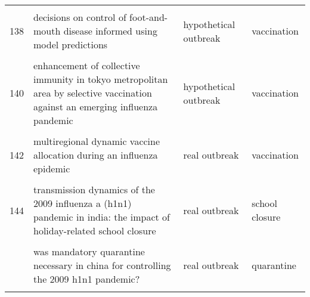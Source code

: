 \documentclass[
]{article}
\begin{document}
\begin{landscape}
\begin{longtable}{l>{\raggedright\arraybackslash}p{3cm}l>{\raggedright\arraybackslash}p{8cm}}
\cellcolor{gray!6}{137} & \cellcolor{gray!6}{cost-effectiveness of workplace closure and travel restriction for mitigating influenza outbreaks: a network-based simulation} & \cellcolor{gray!6}{hypothetical outbreak} & \cellcolor{gray!6}{antiviral prophylaxis,distancing,school closure,travel restriction}\\
138 & decisions on control of foot-and-mouth disease informed using model predictions & hypothetical outbreak & vaccination\\
\cellcolor{gray!6}{139} & \cellcolor{gray!6}{dengue in cape verde: vector control and vaccination} & \cellcolor{gray!6}{hypothetical outbreak} & \cellcolor{gray!6}{larvicides,vaccination}\\
140 & enhancement of collective immunity in tokyo metropolitan area by selective vaccination against an emerging influenza pandemic & hypothetical outbreak & vaccination\\
\addlinespace
\cellcolor{gray!6}{141} & \cellcolor{gray!6}{estimated impact of aggressive empirical antiviral treatment in containing an outbreak of pandemic influenza h1n1 in an isolated first nations community} & \cellcolor{gray!6}{real outbreak} & \cellcolor{gray!6}{antiviral prophylaxis,distancing}\\
142 & multiregional dynamic vaccine allocation during an influenza epidemic & real outbreak & vaccination\\
\cellcolor{gray!6}{143} & \cellcolor{gray!6}{policies to reduce influenza in the workplace: impact assessments using an agent-based model} & \cellcolor{gray!6}{hypothetical outbreak} & \cellcolor{gray!6}{paid sick days,stay-at-home behaviour}\\
144 & transmission dynamics of the 2009 influenza a (h1n1) pandemic in india: the impact of holiday-related school closure & real outbreak & school closure\\
\cellcolor{gray!6}{145} & \cellcolor{gray!6}{vaccination against foot-and-mouth disease: do initial conditions affect its benefit?} & \cellcolor{gray!6}{hypothetical outbreak} & \cellcolor{gray!6}{vaccination}\\
\addlinespace
146 & was mandatory quarantine necessary in china for controlling the 2009 h1n1 pandemic? & real outbreak & quarantine\\
\cellcolor{gray!6}{147} & \cellcolor{gray!6}{a contact-network-based simulation model for evaluating interventions under 'what-if' scenarios in epidemic} & \cellcolor{gray!6}{hypothetical outbreak} & \cellcolor{gray!6}{school closure}\\

\end{longtable}
\end{landscape}
\end{document}
